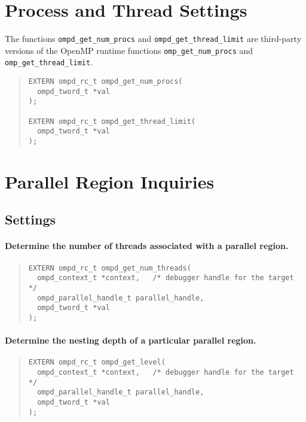 \documentclass{article}
\begin{document}
\section{Process and Thread Settings}

The functions \verb|ompd_get_num_procs| and \verb|ompd_get_thread_limit| are third-party versions of the OpenMP runtime functions \verb|omp_get_num_procs| and \verb|omp_get_thread_limit|.

\begin{quote}
\begin{verbatim}
EXTERN ompd_rc_t ompd_get_num_procs(
  ompd_tword_t *val
); 

EXTERN ompd_rc_t ompd_get_thread_limit(
  ompd_tword_t *val
); 
\end{verbatim}
\end{quote}

\section{Parallel Region Inquiries}

\subsection{Settings}

\paragraph{Determine the number of threads associated with a parallel region.}

\begin{quote}
\begin{verbatim}
EXTERN ompd_rc_t ompd_get_num_threads(
  ompd_context_t *context,   /* debugger handle for the target */
  ompd_parallel_handle_t parallel_handle, 
  ompd_tword_t *val
);  
\end{verbatim}
\end{quote}

\paragraph{Determine the nesting depth of a particular parallel region.}

\begin{quote}
\begin{verbatim}
EXTERN ompd_rc_t ompd_get_level(
  ompd_context_t *context,   /* debugger handle for the target */
  ompd_parallel_handle_t parallel_handle, 
  ompd_tword_t *val
); 
\end{verbatim}
\end{quote}
\end{document}
